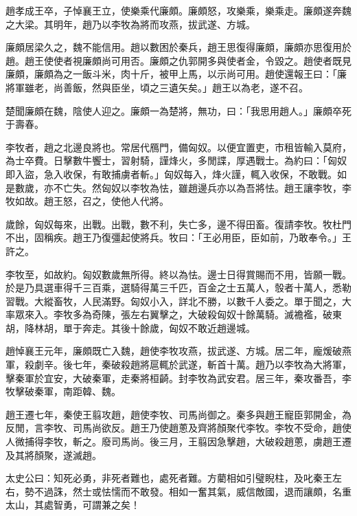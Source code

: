 \begin{pinyinscope}
趙孝成王卒，子悼襄王立，使樂乘代廉頗。廉頗怒，攻樂乘，樂乘走。廉頗遂奔魏之大梁。其明年，趙乃以李牧為將而攻燕，拔武遂、方城。

廉頗居梁久之，魏不能信用。趙以數困於秦兵，趙王思復得廉頗，廉頗亦思復用於趙。趙王使使者視廉頗尚可用否。廉頗之仇郭開多與使者金，令毀之。趙使者既見廉頗，廉頗為之一飯斗米，肉十斤，被甲上馬，以示尚可用。趙使還報王曰：「廉將軍雖老，尚善飯，然與臣坐，頃之三遺矢矣。」趙王以為老，遂不召。

楚聞廉頗在魏，陰使人迎之。廉頗一為楚將，無功，曰：「我思用趙人。」廉頗卒死于壽春。

李牧者，趙之北邊良將也。常居代鴈門，備匈奴。以便宜置吏，市租皆輸入莫府，為士卒費。日擊數牛饗士，習射騎，謹烽火，多閒諜，厚遇戰士。為約曰：「匈奴即入盜，急入收保，有敢捕虜者斬。」匈奴每入，烽火謹，輒入收保，不敢戰。如是數歲，亦不亡失。然匈奴以李牧為怯，雖趙邊兵亦以為吾將怯。趙王讓李牧，李牧如故。趙王怒，召之，使他人代將。

歲餘，匈奴每來，出戰。出戰，數不利，失亡多，邊不得田畜。復請李牧。牧杜門不出，固稱疾。趙王乃復彊起使將兵。牧曰：「王必用臣，臣如前，乃敢奉令。」王許之。

李牧至，如故約。匈奴數歲無所得。終以為怯。邊士日得賞賜而不用，皆願一戰。於是乃具選車得千三百乘，選騎得萬三千匹，百金之士五萬人，彀者十萬人，悉勒習戰。大縱畜牧，人民滿野。匈奴小入，詳北不勝，以數千人委之。單于聞之，大率眾來入。李牧多為奇陳，張左右翼擊之，大破殺匈奴十餘萬騎。滅襜襤，破東胡，降林胡，單于奔走。其後十餘歲，匈奴不敢近趙邊城。

趙悼襄王元年，廉頗既亡入魏，趙使李牧攻燕，拔武遂、方城。居二年，龐煖破燕軍，殺劇辛。後七年，秦破殺趙將扈輒於武遂，斬首十萬。趙乃以李牧為大將軍，擊秦軍於宜安，大破秦軍，走秦將桓齮。封李牧為武安君。居三年，秦攻番吾，李牧擊破秦軍，南距韓、魏。

趙王遷七年，秦使王翦攻趙，趙使李牧、司馬尚御之。秦多與趙王寵臣郭開金，為反閒，言李牧、司馬尚欲反。趙王乃使趙蔥及齊將顏聚代李牧。李牧不受命，趙使人微捕得李牧，斬之。廢司馬尚。後三月，王翦因急擊趙，大破殺趙蔥，虜趙王遷及其將顏聚，遂滅趙。

太史公曰：知死必勇，非死者難也，處死者難。方藺相如引璧睨柱，及叱秦王左右，勢不過誅，然士或怯懦而不敢發。相如一奮其氣，威信敵國，退而讓頗，名重太山，其處智勇，可謂兼之矣！


\end{pinyinscope}